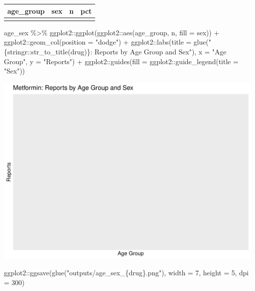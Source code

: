 \documentclass[
  letterpaper,
  DIV=11,
  numbers=noendperiod]{scrartcl}
\newenvironment{Shaded}{\begin{snugshade}}{\end{snugshade}}
\newcommand{\AttributeTok}[1]{\textcolor[rgb]{0.40,0.45,0.13}{#1}}
\newcommand{\DecValTok}[1]{\textcolor[rgb]{0.68,0.00,0.00}{#1}}
\newcommand{\FunctionTok}[1]{\textcolor[rgb]{0.28,0.35,0.67}{#1}}
\newcommand{\NormalTok}[1]{\textcolor[rgb]{0.00,0.23,0.31}{#1}}
\newcommand{\SpecialCharTok}[1]{\textcolor[rgb]{0.37,0.37,0.37}{#1}}
\newcommand{\StringTok}[1]{\textcolor[rgb]{0.13,0.47,0.30}{#1}}
\begin{document}
\begin{longtable}[]{@{}llrr@{}}
\toprule\noalign{}
age\_group & sex & n & pct \\
\midrule\noalign{}
\endhead
\bottomrule\noalign{}
\endlastfoot
\end{longtable}

\begin{Shaded}
\begin{Highlighting}[]
\NormalTok{age\_sex }\SpecialCharTok{\%\textgreater{}\%}
\NormalTok{  ggplot2}\SpecialCharTok{::}\FunctionTok{ggplot}\NormalTok{(ggplot2}\SpecialCharTok{::}\FunctionTok{aes}\NormalTok{(age\_group, n, }\AttributeTok{fill =}\NormalTok{ sex)) }\SpecialCharTok{+}
\NormalTok{  ggplot2}\SpecialCharTok{::}\FunctionTok{geom\_col}\NormalTok{(}\AttributeTok{position =} \StringTok{"dodge"}\NormalTok{) }\SpecialCharTok{+}
\NormalTok{  ggplot2}\SpecialCharTok{::}\FunctionTok{labs}\NormalTok{(}\AttributeTok{title =} \FunctionTok{glue}\NormalTok{(}\StringTok{"\{stringr::str\_to\_title(drug)\}: Reports by Age Group and Sex"}\NormalTok{),}
       \AttributeTok{x =} \StringTok{"Age Group"}\NormalTok{, }\AttributeTok{y =} \StringTok{"Reports"}\NormalTok{) }\SpecialCharTok{+}
\NormalTok{  ggplot2}\SpecialCharTok{::}\FunctionTok{guides}\NormalTok{(}\AttributeTok{fill =}\NormalTok{ ggplot2}\SpecialCharTok{::}\FunctionTok{guide\_legend}\NormalTok{(}\AttributeTok{title =} \StringTok{"Sex"}\NormalTok{))}
\end{Highlighting}
\end{Shaded}

\includegraphics{index_files/figure-pdf/plot-age-sex-1.pdf}

\begin{Shaded}
\begin{Highlighting}[]
\NormalTok{ggplot2}\SpecialCharTok{::}\FunctionTok{ggsave}\NormalTok{(}\FunctionTok{glue}\NormalTok{(}\StringTok{"outputs/age\_sex\_\{drug\}.png"}\NormalTok{), }\AttributeTok{width =} \DecValTok{7}\NormalTok{, }\AttributeTok{height =} \DecValTok{5}\NormalTok{, }\AttributeTok{dpi =} \DecValTok{300}\NormalTok{)}
\end{Highlighting}
\end{Shaded}
\end{document}
